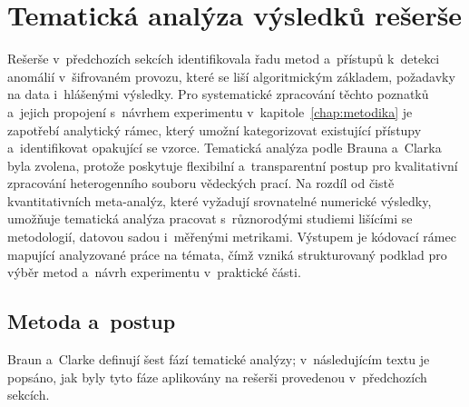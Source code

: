 \section{Tematická analýza výsledků rešerše}
\label{sec:tematicka-analyza}

Rešerše v~předchozích sekcích identifikovala řadu metod a~přístupů k~detekci anomálií v~šifrovaném provozu, které se liší algoritmickým základem, požadavky na data i~hlášenými výsledky. Pro systematické zpracování těchto poznatků a~jejich propojení s~návrhem experimentu v~kapitole~\ref{chap:metodika} je zapotřebí analytický rámec, který umožní kategorizovat existující přístupy a~identifikovat opakující se vzorce. Tematická analýza podle Brauna a~Clarka \parencite{Braun2006} byla zvolena, protože poskytuje flexibilní a~transparentní postup pro kvalitativní zpracování heterogenního souboru vědeckých prací. Na rozdíl od čistě kvantitativních meta-analýz, které vyžadují srovnatelné numerické výsledky, umožňuje tematická analýza pracovat s~různorodými studiemi lišícími se metodologií, datovou sadou i~měřenými metrikami. Výstupem je kódovací rámec mapující analyzované práce na témata, čímž vzniká strukturovaný podklad pro výběr metod a~návrh experimentu v~praktické části.

\subsection{Metoda a~postup}
\label{sec:ta-metoda}

Braun a~Clarke \parencite{Braun2006} definují šest fází tematické analýzy; v~následujícím textu je popsáno, jak byly tyto fáze aplikovány na rešerši provedenou v~předchozích sekcích.

